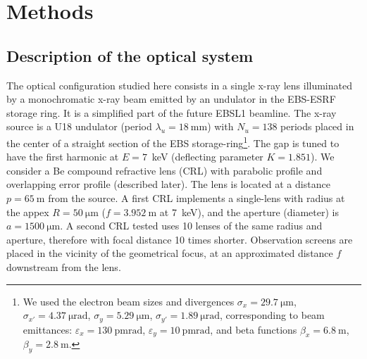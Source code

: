 \documentclass[preprint]{iucr}
\begin{document}
\section{Methods}\label{sec:methods}

\subsection{Description of the optical system}\label{sec:descriptionsystem}

The optical configuration studied here consists in a single x-ray lens illuminated by a monochromatic x-ray beam emitted by an undulator in the EBS-ESRF storage ring. It is a simplified part of the future EBSL1 beamline.
The x-ray source is a U18 undulator (period $\lambda_u=\SI{18}{\milli\meter}$) with $N_u=138$ periods placed in the center of a straight section of the EBS storage-ring\footnote{We used the electron beam sizes and divergences $\sigma_x=\SI{29.7}{\micro\meter}$,
$\sigma_{x'}=\SI{4.37}{\micro\radian}$,
$\sigma_y=\SI{5.29}{\micro\meter}$,
$\sigma_{y'}=\SI{1.89}{\micro\radian}$, corresponding to beam emittances:  $\varepsilon_x=\SI{130}{\pico\meter \radian}$,
$\varepsilon_y=\SI{10}{\pico\meter \radian}$, and beta functions
$\beta_x=\SI{6.8}{\meter}$,
$\beta_y=\SI{2.8}{\meter}$.
}. The gap is tuned to have the first harmonic at $E=7$~keV (deflecting parameter $K=1.851$). We consider a Be compound refractive lens (CRL) with parabolic profile and overlapping error profile (described later). The lens is located at a distance $p=\SI{65}{\meter}$ from the source. 
A first CRL implements a single-lens with radius at the appex $R=\SI{50}{\micro\meter}$ ($f=\SI{3.952}{\meter}$ at 7~keV), 
 and the aperture (diameter) is $a=\SI{1500}{\micro\meter}$. A second CRL tested uses 10 lenses of the same radius and aperture, therefore with focal distance 10 times shorter.
 Observation screens are placed in the vicinity of the geometrical focus, at an approximated distance $f$ downstream from the lens. 
\end{document}
